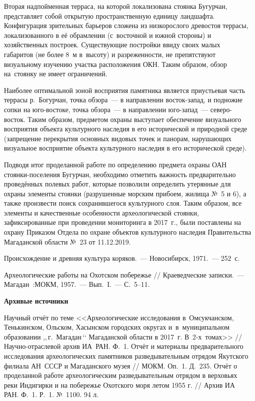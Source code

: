 Вторая надпойменная терраса, на которой локализована стоянка Бугурчан, представляет собой открытую пространственную единицу ландшафта. Конфигурация зрительных барьеров сложена из низкорослого древостоя террасы, локализованного в её обрамлении (с~восточной и южной стороны) и хозяйственных построек. Существующие постройки ввиду своих малых габаритов (не более 8~м в~высоту) и разреженности, не препятствуют визуальному изучению участка расположения ОКН. Таким образом, обзор на~стоянку не имеет ограничений.

Наиболее оптимальной зоной восприятия памятника является приустьевая часть террасы р.~Богурчан, точка обзора~--- в направлении восток-запад, и подножие сопки на юго-востоке, точка обзора~--- в направлении юго-запад~--- северо-восток. Таким образом, предметом охраны выступает обеспечение визуального восприятия объекта культурного наследия в его исторической и природной среде (запрещение перекрытия основных видовых точек и панорам, нарушающих визуальное восприятие объекта культурного наследия в его исторической среде).

Подводя итог проделанной работе по определению предмета охраны ОАН стоянки-поселения Бугурчан, необходимо отметить важность предварительно проведённых полевых работ, которые позволили определить утерянные для охраны элементы стоянки (разрушенные морским прибоем, жилища №~5 и 6), а также произвести поиск сохранившегося культурного слоя. Таким образом, все элементы и качественные особенности археологической стоянки, зафиксированные при проведении мониторинга в 2017~г., были поставлены на охрану Приказом Отдела по охране объектов культурного наследия Правительства Магаданской области №~23 от 11.12.2019.

\begin{thebibliography}{99}

\bibitem{} Происхождение и древняя культура коряков.~--- Новосибирск, 1971.~--- 252~с.

\bibitem{} Археологические работы на Охотском побережье //  Краеведческие записки.~--- Магадан~:МОКМ, 1957.~--- Вып.~I.~--- С.~5--11.

\textbf{Архивые источники}

\bibitem{} Научный отчёт по теме <<Археологические исследования в~Омсукчанском, Тенькинском, Ольском, Хасынском городских округах и~в~муниципальном образовании ,,\,г.~Магадан\,‘‘ Магаданской области в 2017~г. В~2-х~томах>> // Научно-отраслевой архив ИА~РАН. Ф.~1.
\bibitem{} Отчёт и материалы предварительного исследования археологических памятников разведывательным отрядом Якутского филиала АН~СССР и Магаданского музея // МОКМ. Оп.~1. Д.~235.
\bibitem{} Отчёт о проделанной работе археологическим разведывательным отрядом в верховьях реки Индигирки и на побережье Охотского моря летом 1955 г. // Архив ИА РАН. Ф.~1. Р.~1. №~1100. 94 л.



\end{thebibliography}
